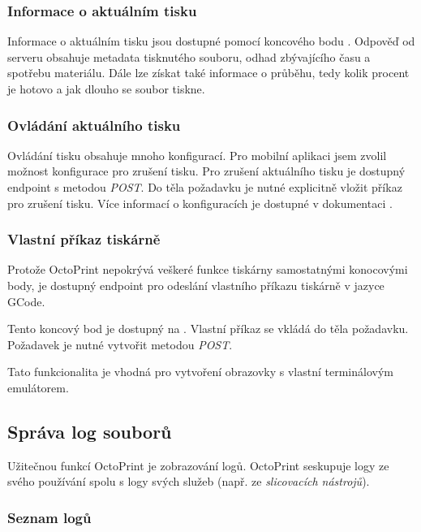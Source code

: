 \subsubsection*{Informace o aktuálním tisku}

Informace o aktuálním tisku jsou dostupné pomocí koncového bodu .
Odpověď od serveru obsahuje metadata tisknutého souboru, odhad zbývajícího času a spotřebu materiálu.
Dále lze získat také informace o průběhu, tedy kolik procent je hotovo a jak dlouho se soubor tiskne.

\subsubsection*{Ovládání aktuálního tisku}

Ovládání tisku obsahuje mnoho konfigurací.
Pro mobilní aplikaci jsem zvolil možnost konfigurace pro zrušení tisku.
Pro zrušení aktuálního tisku je dostupný endpoint  s metodou \textit{POST}.
Do těla požadavku je nutné explicitně vložit příkaz pro zrušení tisku.
Více informací o konfiguracích je dostupné v dokumentaci \cite{octoprint-docs-job}.

\subsubsection*{Vlastní příkaz tiskárně}

Protože OctoPrint nepokrývá veškeré funkce tiskárny samostatnými konocovými body, je dostupný endpoint pro odeslání vlastního příkazu tiskárně v jazyce GCode.

Tento koncový bod je dostupný na .
Vlastní příkaz se vkládá do těla požadavku.
Požadavek je nutné vytvořit metodou \textit{POST}.

Tato funkcionalita je vhodná pro vytvoření obrazovky s vlastní terminálovým emulátorem.

\subsection{Správa log souborů}

Užitečnou funkcí OctoPrint je zobrazování logů.
OctoPrint seskupuje logy ze svého používání spolu s logy svých služeb (např. ze \textit{slicovacích nástrojů}).

\subsubsection*{Seznam logů}

